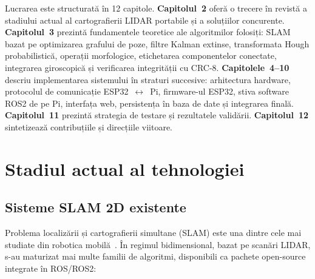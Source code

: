 \documentclass[a4paper,12pt,twoside,openany]{report}
\begin{document}
Lucrarea este structurată în 12 capitole. \textbf{Capitolul~2} oferă o
trecere în revistă a stadiului actual al cartografierii LIDAR portabile
și a soluțiilor concurente. \textbf{Capitolul~3} prezintă fundamentele
teoretice ale algoritmilor folosiți: SLAM bazat pe optimizarea grafului
de poze, filtre Kalman extinse, transformata Hough probabilistică,
operații morfologice, etichetarea componentelor conectate, integrarea
giroscopică și verificarea integrității cu CRC-8. \textbf{Capitolele~4--10}
descriu implementarea sistemului în straturi succesive: arhitectura
hardware, protocolul de comunicație ESP32~$\leftrightarrow$~Pi,
firmware-ul ESP32, stiva software ROS2 de pe Pi, interfața web,
persistența în baza de date și integrarea finală.
\textbf{Capitolul~11} prezintă strategia de testare și rezultatele
validării. \textbf{Capitolul~12} sintetizează contribuțiile și
direcțiile viitoare.

\clearpage

\chapter{Stadiul actual al tehnologiei}
\label{cap:stadiul}


\section{Sisteme SLAM 2D existente}
\label{sec:slamexistente}

Problema localizării și cartografierii simultane (SLAM) este una dintre
cele mai studiate din robotica mobilă~\cite{thrun2005probrobotics,
lidar_slam_survey}. În regimul bidimensional, bazat pe scanări LIDAR, s-au
maturizat mai multe familii de algoritmi, disponibili ca pachete
open-source integrate în ROS/ROS2:
\end{document}
